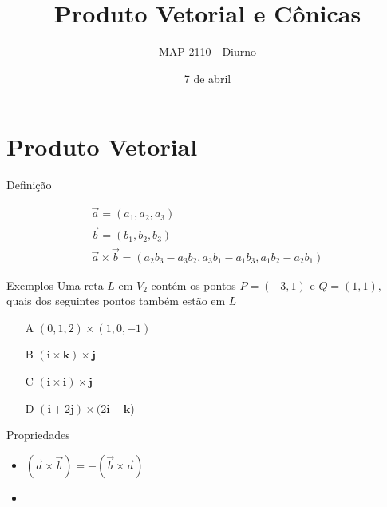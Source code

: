 \documentclass{beamer}
\title[Retas e Planos]{Produto Vetorial e Cônicas}
\author{MAP 2110 - Diurno}
\institute{IME USP}
\date{7 de abril}
\begin{document}
\begin{frame}
  \titlepage
\end{frame}


\section {Produto Vetorial}

\begin{frame}{Definição}
 
 \begin{gather*}
   \vec{a}=(a_1,a_2,a_3)\\
   \vec{b}=(b_1,b_2,b_3)\\
   \vec{a}\times \vec{b}=(a_2b_3-a_3b_2, a_3b_1-a_1b_3, a_1b_2-a_2b_1)
 \end{gather*}

\end{frame}

\begin{frame}{Exemplos}
Uma reta $L$ em $V_2$ contém os pontos $P=(-3,1)$ e $Q=(1,1),$ quais dos seguintes pontos também estão em $L$
\begin{itemize}
   \item[A]$(0, 1, 2) \times (1,0,-1)$
   \item[B]$ (\mathbf{i}\times\mathbf{k})\times\mathbf{j}$
   \item[C]$ (\mathbf{i}\times\mathbf{i})\times\mathbf{j}$
   \item[D]$ (\mathbf{i} + 2\mathbf{j}) \times (2\mathbf{i} - \mathbf{k}$)
\end{itemize}
\end{frame}
\begin{frame}
  

\end{frame}

\begin{frame}{Propriedades}
  \begin{itemize}
    \item $(\vec{a}\times \vec{b}) = - (\vec{b}\times \vec{a})$
    \item 
    
  \end{itemize}

\end{frame}
\end{document}
